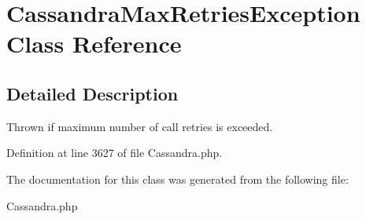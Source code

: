 \hypertarget{classCassandraMaxRetriesException}{
\section{CassandraMaxRetriesException Class Reference}
\label{classCassandraMaxRetriesException}
}


\subsection{Detailed Description}
Thrown if maximum number of call retries is exceeded. 

Definition at line 3627 of file Cassandra.php.



The documentation for this class was generated from the following file:\begin{DoxyCompactItemize}
\item 
Cassandra.php\end{DoxyCompactItemize}
